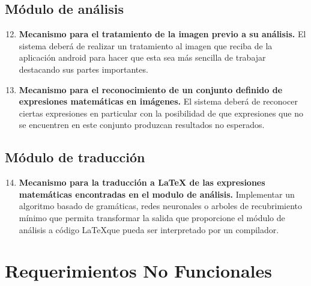     \subsection{Módulo de análisis}
    \begin{enumerate}[label=\textbf{RF\arabic*.}]
    	\setcounter{enumi}{11}
    	\item \textbf{Mecanismo para el tratamiento de la imagen previo a su análisis.} El sistema deberá de realizar un tratamiento al imagen que reciba de la aplicación android para hacer que esta sea más sencilla de trabajar destacando sus partes importantes.
    	\item \textbf{Mecanismo para el reconocimiento de un conjunto definido de expresiones matemáticas en imágenes.} El sistema deberá de reconocer ciertas expresiones en particular con la posibilidad de que expresiones que no se encuentren en este conjunto produzcan resultados no esperados.
    \end{enumerate}
    
    \subsection{Módulo de traducción}
    \begin{enumerate}[label=\textbf{RF\arabic*.}]
    	\setcounter{enumi}{13}
    	\item \textbf{Mecanismo para la traducción a \LaTeX{} de las expresiones matemáticas encontradas en el modulo de análisis.} Implementar un algoritmo basado de gramáticas, redes neuronales o arboles de recubrimiento mínimo que permita transformar la salida que proporcione el módulo de análisis a código \LaTeX que pueda ser interpretado por un compilador.
    \end{enumerate}
    
\section{Requerimientos No Funcionales} 

